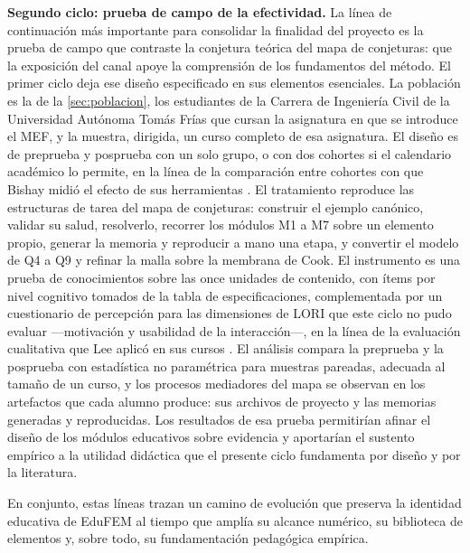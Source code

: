 \textbf{Segundo ciclo: prueba de campo de la efectividad.} La línea de continuación más importante para consolidar la finalidad del proyecto es la prueba de campo que contraste la conjetura teórica del mapa de conjeturas: que la exposición del canal apoye la comprensión de los fundamentos del método. El primer ciclo deja ese diseño especificado en sus elementos esenciales. La población es la de la \autoref{sec:poblacion}, los estudiantes de la Carrera de Ingeniería Civil de la Universidad Autónoma Tomás Frías que cursan la asignatura en que se introduce el MEF, y la muestra, dirigida, un curso completo de esa asignatura. El diseño es de preprueba y posprueba con un solo grupo, o con dos cohortes si el calendario académico lo permite, en la línea de la comparación entre cohortes con que Bishay midió el efecto de sus herramientas \autocite[pp.~4-5, 13]{bishay2020teaching}. El tratamiento reproduce las estructuras de tarea del mapa de conjeturas: construir el ejemplo canónico, validar su salud, resolverlo, recorrer los módulos M1 a M7 sobre un elemento propio, generar la memoria y reproducir a mano una etapa, y convertir el modelo de Q4 a Q9 y refinar la malla sobre la membrana de Cook. El instrumento es una prueba de conocimientos sobre las once unidades de contenido, con ítems por nivel cognitivo tomados de la tabla de especificaciones, complementada por un cuestionario de percepción para las dimensiones de LORI que este ciclo no pudo evaluar —motivación y usabilidad de la interacción—, en la línea de la evaluación cualitativa que Lee aplicó en sus cursos \autocite[p.~168]{lee2015interactive}. El análisis compara la preprueba y la posprueba con estadística no paramétrica para muestras pareadas, adecuada al tamaño de un curso, y los procesos mediadores del mapa se observan en los artefactos que cada alumno produce: sus archivos de proyecto y las memorias generadas y reproducidas. Los resultados de esa prueba permitirían afinar el diseño de los módulos educativos sobre evidencia y aportarían el sustento empírico a la utilidad didáctica que el presente ciclo fundamenta por diseño y por la literatura.

En conjunto, estas líneas trazan un camino de evolución que preserva la identidad educativa de EduFEM al tiempo que amplía su alcance numérico, su biblioteca de elementos y, sobre todo, su fundamentación pedagógica empírica.
